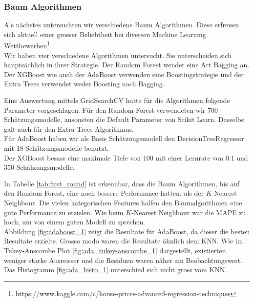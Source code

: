 \subsubsection{Baum Algorithmen}
Als nächstes untersuchten wir verschiedene Baum Algorithmen. Diese erfreuen sich aktuell einer grosser Beliebtheit bei diversen Machine Learning Wettbewerben\footnote{https://www.kaggle.com/c/house-prices-advanced-regression-techniques}.\\[2ex]
%
Wir haben vier verschiedene Algorithmen untersucht. Sie unterscheiden sich hauptsächlich in ihrer Strategie. Der Random Forest wendet eine Art Bagging an. Der XGBoost wie auch der AdaBoost verwenden eine Boostingstrategie und der Extra Trees verwendet weder Boosting noch Bagging.

Eine Auswertung mittels GridSearchCV hatte für die Algorithmen folgende Parameter vorgeschlagen.
Für den Random Forest verwendeten wir 700 Schätzungsmodelle, ansonsten die Default Parameter von Scikit Learn. Dasselbe galt auch für den Extra Trees Algorithmus.\\
Für AdaBoost haben wir als Basis Schätzungsmodell den DecisionTreeRegressor mit 18 Schätzungsmodelle benutzt.\\
Der XGBoost besass eine maximale Tiefe von 100 mit einer Lernrate von 0.1 und 350 Schätzungsmodelle.

\begin{table}[ht]
\centering
{}
\caption{Ergebnisse der Baum Algorithmen}
\label{tab:first_round}
\end{table}

In Tabelle \ref{tab:first_round} ist erkennbar, dass die Baum Algorithmen, bis auf den Random Forest, eine noch bessere Performance hatten, als der $K$-Nearest Neighbour. Die vielen kategorischen Features halfen den Baumalgorithmen eine gute Performance zu erzielen. Wie beim $K$-Nearest Neighbour war die MAPE zu hoch, um von einem guten Modell zu sprechen.\\
Abbildung \ref{fig:adaboost_1} zeigt die Resultate für AdaBoost, da dieser die besten Resultate erzielte. Gros­so mo­do waren die Resultate ähnlich dem KNN. Wie im Tukey-Anscombe Plot \ref{fig:ada_tukey-anscombe_1} dargestellt, existierten weniger starke Ausreisser und die Residuen waren näher am Beobachtungswert. Das Histogramm \ref{fig:ada_histo_1} unterschied sich nicht gross vom KNN.

